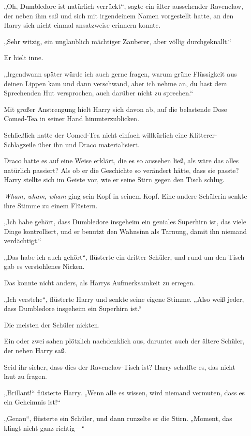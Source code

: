 {„Oh, Dumbledore ist natürlich verrückt“, sagte ein älter aussehender Ravenclaw, der neben ihm saß und sich mit irgendeinem Namen vorgestellt hatte, an den Harry sich nicht einmal ansatzweise erinnern konnte.

„Sehr witzig, ein unglaublich mächtiger Zauberer, aber völlig durchgeknallt.“

Er hielt inne.

„Irgendwann später würde ich auch gerne fragen, warum grüne Flüssigkeit aus deinen Lippen kam und dann verschwand, aber ich nehme an, du hast dem Sprechenden Hut versprochen, auch darüber nicht zu sprechen.“

Mit großer Anstrengung hielt Harry sich davon ab, auf die belastende Dose Comed-Tea in seiner Hand hinunterzublicken.

Schließlich hatte der Comed-Tea nicht einfach willkürlich eine Klitterer-Schlagzeile über ihn und Draco materialisiert.

Draco hatte es auf eine Weise erklärt, die es so aussehen ließ, als wäre das alles natürlich passiert? Als ob er die Geschichte so verändert hätte, dass sie passte? Harry stellte sich im Geiste vor, wie er seine Stirn gegen den Tisch schlug.

\emph{Wham, wham, wham} ging sein Kopf in seinem Kopf. Eine andere Schülerin senkte ihre Stimme zu einem Flüstern.

„Ich habe gehört, dass Dumbledore insgeheim ein geniales Superhirn ist, das viele Dinge kontrolliert, und er benutzt den Wahnsinn als Tarnung, damit ihn niemand verdächtigt.“

„Das habe ich auch gehört“, flüsterte ein dritter Schüler, und rund um den Tisch gab es verstohlenes Nicken.

Das konnte nicht anders, als Harrys Aufmerksamkeit zu erregen.

„Ich verstehe“, flüsterte Harry und senkte seine eigene Stimme. „Also weiß jeder, dass Dumbledore insgeheim ein Superhirn ist.“

Die meisten der Schüler nickten.

Ein oder zwei sahen plötzlich nachdenklich aus, darunter auch der ältere Schüler, der neben Harry saß.

Seid ihr sicher, dass dies der Ravenclaw-Tisch ist? Harry schaffte es, das nicht laut zu fragen.

„Brillant!“ flüsterte Harry. „Wenn alle es wissen, wird niemand vermuten, dass es ein Geheimnis ist!“

„Genau“, flüsterte ein Schüler, und dann runzelte er die Stirn. „Moment, das klingt nicht ganz richtig—“

}
